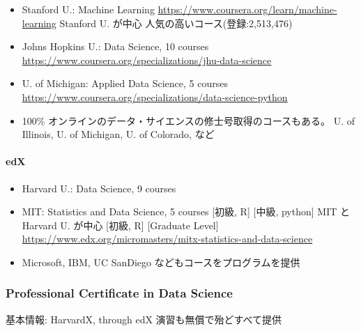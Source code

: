 \documentclass[
]{book}
\providecommand{\tightlist}{%
  \setlength{\itemsep}{0pt}\setlength{\parskip}{0pt}}
\theoremstyle{definition}
\theoremstyle{definition}
\theoremstyle{definition}
\theoremstyle{definition}
\theoremstyle{remark}
\begin{document}
\begin{itemize}
\tightlist
\item
  Stanford U.: Machine Learning \url{https://www.coursera.org/learn/machine-learning}
  Stanford U. が中心 人気の高いコース(登録:2,513,476)
\item
  Johns Hopkins U.: Data Science, 10 courses \url{https://www.coursera.org/specializations/jhu-data-science}
\item
  U. of Michigan: Applied Data Science, 5 courses \url{https://www.coursera.org/specializations/data-science-python}
\item
  100\% オンラインのデータ・サイエンスの修士号取得のコースもある。 U. of Illinois, U. of Michigan, U. of Colorado, など
\end{itemize}

\hypertarget{edx}{%
\paragraph{edX}\label{edx}}

\begin{itemize}
\tightlist
\item
  Harvard U.: Data Science, 9 courses
\item
  MIT: Statistics and Data Science, 5 courses
  {[}初級, R{]} {[}中級, python{]}
  MIT と Harvard U. が中心 {[}初級, R{]} {[}Graduate Level{]}
  \url{https://www.edx.org/micromasters/mitx-statistics-and-data-science}
\item
  Microsoft, IBM, UC SanDiego などもコースをプログラムを提供
\end{itemize}

\hypertarget{professional-certificate-in-data-science}{%
\subsubsection{Professional Certificate in Data Science}\label{professional-certificate-in-data-science}}

基本情報: HarvardX, through edX 演習も無償で殆どすべて提供
\end{document}
